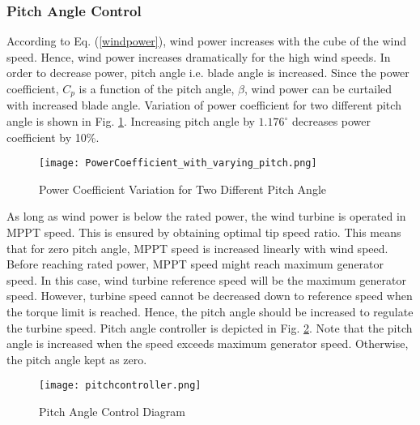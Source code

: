\subsubsection{Pitch Angle Control}
According to Eq. (\ref{windpower}), wind power increases with the cube of the wind speed. Hence, wind power increases dramatically for the high wind speeds. In order to decrease power, pitch angle i.e. blade angle is increased. Since the power coefficient, $C_{p}$ is a function of the pitch angle, $\beta$, wind power can be curtailed with increased blade angle. Variation of power coefficient for two different pitch angle is shown in Fig. \ref{cpwithtwopitchangle}. Increasing pitch angle by $1.176^{\circ}$ decreases power coefficient by 10\%.\par
\begin{figure}[h!]
	\centering
	\texttt{[image: PowerCoefficient\_with\_varying\_pitch.png]}
	\caption{Power Coefficient Variation for Two Different Pitch Angle}
	\label{cpwithtwopitchangle}
\end{figure} 
As long as wind power is below the rated power, the wind turbine is operated in MPPT speed. This is ensured by obtaining optimal tip speed ratio. This means that for zero pitch angle, MPPT speed is increased linearly with wind speed. Before reaching rated power, MPPT speed might reach maximum generator speed. In this case, wind turbine reference speed will be the maximum generator speed. However, turbine speed cannot be decreased down to reference speed when the torque limit is reached. Hence, the pitch angle should be increased to regulate the turbine speed. Pitch angle controller is depicted in Fig. \ref{pitchcontroller}. Note that the pitch angle is increased when the speed exceeds maximum generator speed. Otherwise, the pitch angle kept as zero. 
\begin{figure}[h!]
	\centering
	\texttt{[image: pitchcontroller.png]}
	\caption{Pitch Angle Control Diagram}
	\label{pitchcontroller}
\end{figure}

